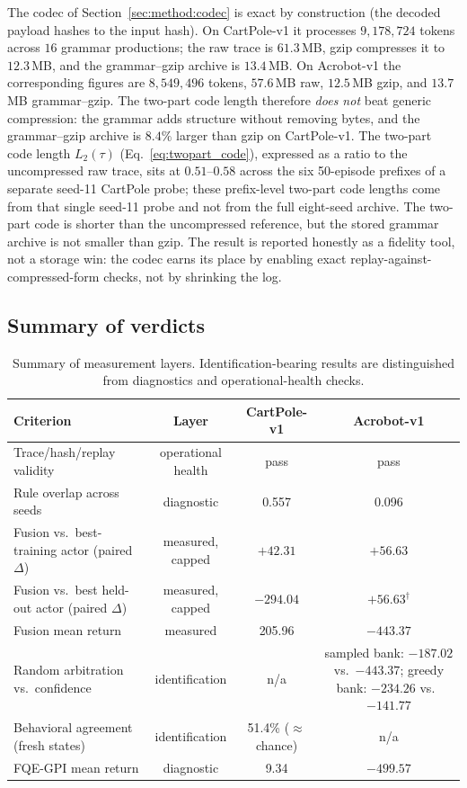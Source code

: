 \documentclass[11pt]{article}
\begin{document}
The codec of Section~\ref{sec:method:codec} is exact by construction (the decoded payload hashes to the
input hash). On CartPole-v1 it processes $9{,}178{,}724$ tokens across $16$ grammar productions; the raw
trace is $61.3$\,MB, gzip compresses it to $12.3$\,MB, and the grammar--gzip archive is $13.4$\,MB. On
Acrobot-v1 the corresponding figures are $8{,}549{,}496$ tokens, $57.6$\,MB raw, $12.5$\,MB gzip, and
$13.7$\,MB grammar--gzip. The two-part code length therefore \emph{does not} beat generic compression:
the grammar adds structure without removing bytes, and the grammar--gzip archive is $8.4\%$ larger than
gzip on CartPole-v1. The two-part code length $L_2(\tau)$ (Eq.~\ref{eq:twopart_code}), expressed as a
ratio to the uncompressed raw trace, sits at $0.51$--$0.58$ across the six 50-episode prefixes of a
separate seed-11 CartPole probe; these prefix-level two-part code lengths come from that single seed-11
probe and
not from the full eight-seed archive. The two-part code is shorter than the uncompressed reference, but
the stored grammar archive is not smaller than gzip. The result is reported honestly as a fidelity tool,
not a storage win: the codec earns
its place by enabling exact replay-against-compressed-form checks, not by shrinking the log.

\subsection{Summary of verdicts}
\label{sec:experiments:verdicts}

\begin{table}[t]
\centering\small
\setlength{\tabcolsep}{4.5pt}
\caption{Summary of measurement layers. Identification-bearing results are distinguished from
diagnostics and operational-health checks.}
\label{tab:verdicts}
\begin{tabular}{@{}lccc@{}}
\toprule
Criterion & Layer & CartPole-v1 & Acrobot-v1 \\
\midrule
Trace/hash/replay validity & operational health & pass & pass \\
Rule overlap across seeds & diagnostic & 0.557 & 0.096 \\
Fusion vs.\ best-training actor (paired $\Delta$) & measured, capped & $+42.31$ & $+56.63$ \\
Fusion vs.\ best held-out actor (paired $\Delta$) & measured, capped & $-294.04$ & $+56.63^{\dagger}$ \\
Fusion mean return & measured & 205.96 & $-443.37$ \\
Random arbitration vs.\ confidence & identification & n/a & sampled bank: $-187.02$ vs.\ $-443.37$; greedy bank: $-234.26$ vs.\ $-141.77$ \\
Behavioral agreement (fresh states) & identification & 51.4\% ($\approx$ chance) & n/a \\
FQE-GPI mean return & diagnostic & 9.34 & $-499.57$ \\
\bottomrule
\end{tabular}
\end{table}
\end{document}
